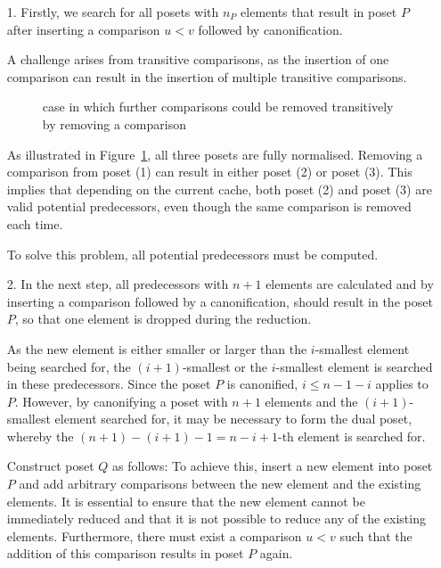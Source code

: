 \documentclass[10pt,journal,compsoc]{IEEEtran}
\begin{document}
\begin{itemize}
  \item[1.]
    Firstly, we search for all posets with $n_P$ elements that result in poset $P$ after inserting a comparison $u < v$ followed by canonification.

    A challenge arises from transitive comparisons, as the insertion of one comparison can result in the insertion of multiple transitive comparisons.

    \begin{figure}[!b]
      \centering
      
      \caption{case in which further comparisons could be removed transitively by removing a comparison}
      \label{fig:backward_problematic}
    \end{figure}

    As illustrated in Figure~\ref{fig:backward_problematic}, all three posets are fully normalised.
    Removing a comparison from poset (1) can result in either poset (2) or poset (3).
    This implies that depending on the current cache, both poset (2) and poset (3) are valid potential predecessors, even though the same comparison is removed each time.

    To solve this problem, all potential predecessors must be computed.

  \item[2.]
    In the next step, all predecessors with $n + 1$ elements are calculated and by inserting a comparison followed by a canonification, should result in the poset $P$, so that one element is dropped during the reduction.

    As the new element is either smaller or larger than the $i$-smallest element being searched for, the $(i + 1)$-smallest or the $i$-smallest element is searched in these predecessors. Since the poset $P$ is canonified, $i \leq n - 1 - i$ applies to $P$. However, by canonifying a poset with $n + 1$ elements and the $(i + 1)$-smallest element searched for, it may be necessary to form the dual poset, whereby the $(n + 1) - (i + 1) - 1 = n - i + 1$-th element is searched for.

    Construct poset $Q$ as follows:
    To achieve this, insert a new element into poset $P$ and add arbitrary comparisons between the new element and the existing elements.
    It is essential to ensure that the new element cannot be immediately reduced and that it is not possible to reduce any of the existing elements.
    Furthermore, there must exist a comparison $u < v$ such that the addition of this comparison results in poset $P$ again.


\end{itemize}
\end{document}
